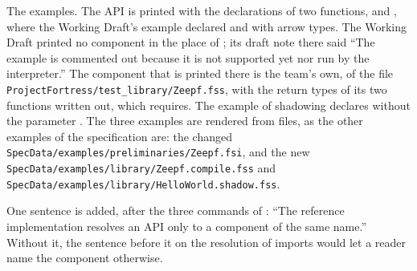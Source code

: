 \begin{description}
The examples.
The API  is printed with the declarations of two functions,
 and
, where the Working
Draft's example declared  and  with arrow types.
The Working Draft printed no component in the place of ; its
draft note there said ``The example is commented out because it is not
supported yet nor run by the interpreter.''
The component  that is printed there is the team's own, of the
file \nolinkurl{ProjectFortress/test_library/Zeepf.fss}, with the return types
of its two functions written out, which  requires.
The example of shadowing declares  without the parameter .
The three examples are rendered from files, as the other examples of the
specification are: the changed
\nolinkurl{SpecData/examples/preliminaries/Zeepf.fsi}, and the new
\nolinkurl{SpecData/examples/library/Zeepf.compile.fss} and
\nolinkurl{SpecData/examples/library/HelloWorld.shadow.fss}.

One sentence is added, after the three commands of :
``The reference implementation resolves an API only to a component of the
same name.''
Without it, the sentence before it on the resolution of imports would let a
reader name the component otherwise.


\end{description}
